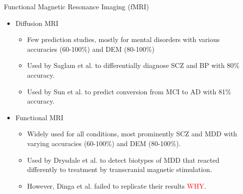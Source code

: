 \documentclass[10pt]{beamer}
\begin{document}
\begin{frame}[t]{Functional Magnetic Resonance Imaging (fMRI)}
{\begin{itemize}
\begin{itemize}
                \end{itemize}
                \item[\textcolor{gray!50}{\textbullet}] \textcolor{gray!50}{\footnotesize{Diffusion MRI}}
                \begin{itemize}
                    \setlength\itemsep{-0.4em}
                    \item[] \textcolor{gray!50}{\scriptsize{Few prediction studies, mostly for mental disorders with various accuracies (60-100\%) and DEM (80-100\%)}}
                    \item[\textcolor{gray!50}{\textbullet}] \textcolor{gray!50}{\scriptsize{Used by Saglam et al. to differentially diagnose SCZ and BP with 80\% accuracy.}}
                    \item[\textcolor{gray!50}{\textbullet}] \textcolor{gray!50}{\scriptsize{Used by Sun et al. to predict conversion from MCI to AD with 81\% accuracy.}}
                \end{itemize}
                \item {\footnotesize Functional MRI}
                \begin{itemize}
                    \setlength\itemsep{-0.4em}
                    \item {\scriptsize Widely used for all conditions, most prominently SCZ and MDD with varying accuracies (60-100\%) and DEM (80-100\%).}
                    \item {\scriptsize Used by Drysdale et al. to detect biotypes of MDD that reacted differently to treatment by transcranial magnetic stimulation.}
                    \item {\scriptsize However, Dinga et al. failed to replicate their results \textcolor{red}{WHY}.}
                \end{itemize}
            \end{itemize}

        }
    \end{frame}

    \newsavebox{\molstudies}

    \newsavebox{\moldem}
\end{document}
